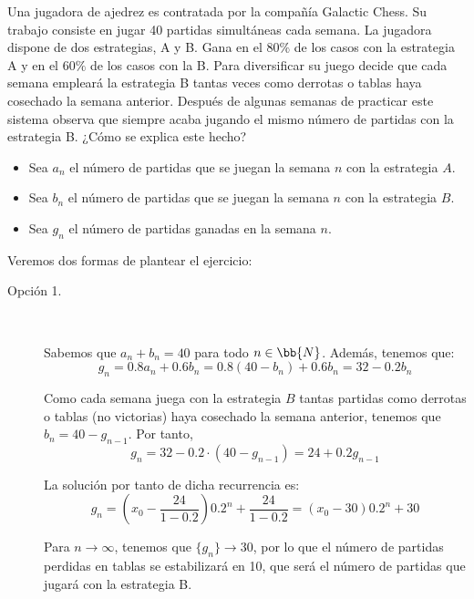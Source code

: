 \begin{ejercicio}
    Una jugadora de ajedrez es contratada por la compañía Galactic Chess. Su trabajo consiste en jugar 40 partidas simultáneas cada semana. La jugadora dispone de dos estrategias, A y B. Gana en el $80\%$ de los casos con la estrategia A y en el $60\%$ de los casos con la B. Para diversificar su juego decide que cada semana empleará la estrategia B tantas veces como derrotas o tablas haya cosechado la semana anterior. Después de algunas semanas de practicar este sistema observa que siempre acaba jugando el mismo número de partidas con la estrategia B. ¿Cómo se explica este hecho?

    \begin{itemize}
        \item Sea $a_n$ el número de partidas que se juegan la semana $n$ con la estrategia $A$.
        \item Sea $b_n$ el número de partidas que se juegan la semana $n$ con la estrategia $B$.
        \item Sea $g_n$ el número de partidas ganadas en la semana $n$.
    \end{itemize}

    Veremos dos formas de plantear el ejercicio:
    \begin{description}
        \item[Opción 1.]~

        Sabemos que $a_n+b_n=40$ para todo $n\in \bb{N}$. Además, tenemos que:
        \begin{equation*}
            g_n = 0.8a_n + 0.6b_n = 0.8(40-b_n) + 0.6b_n = 32-0.2b_n
        \end{equation*}
    
        Como cada semana juega con la estrategia $B$ tantas partidas como derrotas o tablas (no victorias) haya cosechado la semana anterior, tenemos que $b_n = 40-g_{n-1}$. Por tanto,
        \begin{equation*}
            g_n = 32-0.2\cdot (40-g_{n-1})
            = 24+0.2g_{n-1}
        \end{equation*}
    
        La solución por tanto de dicha recurrencia es:
        \begin{equation*}
            g_n = \left(x_0-\frac{24}{1-0.2}\right)0.2^n + \frac{24}{1-0.2}
            = \left(x_0-30\right)0.2^n + 30
        \end{equation*}
    
        Para $n\to \infty$, tenemos que $\{g_n\}\to 30$, por lo que el número de partidas perdidas en tablas se estabilizará en 10, que será el número de partidas que jugará con la estrategia B.


\end{description}
\end{ejercicio}
